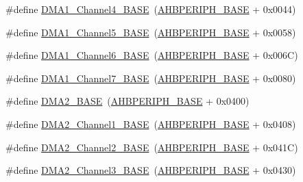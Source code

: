 \begin{DoxyCompactItemize}
\item 
\#define \hyperlink{group___peripheral__memory__map_ga1adc93cd0baf0897202c71110e045692}{D\+M\+A1\+\_\+\+Channel4\+\_\+\+B\+A\+SE}~(\hyperlink{openmotestm_2library_2inc_2stm32f10x__map_8h_a92eb5d49730765d2abd0f5b09548f9f5}{A\+H\+B\+P\+E\+R\+I\+P\+H\+\_\+\+B\+A\+SE} + 0x0044)
\item 
\#define \hyperlink{group___peripheral__memory__map_gac041a71cd6c1973964f847a68aa14478}{D\+M\+A1\+\_\+\+Channel5\+\_\+\+B\+A\+SE}~(\hyperlink{openmotestm_2library_2inc_2stm32f10x__map_8h_a92eb5d49730765d2abd0f5b09548f9f5}{A\+H\+B\+P\+E\+R\+I\+P\+H\+\_\+\+B\+A\+SE} + 0x0058)
\item 
\#define \hyperlink{group___peripheral__memory__map_ga896c2c7585dd8bc3969cf8561f689d2d}{D\+M\+A1\+\_\+\+Channel6\+\_\+\+B\+A\+SE}~(\hyperlink{openmotestm_2library_2inc_2stm32f10x__map_8h_a92eb5d49730765d2abd0f5b09548f9f5}{A\+H\+B\+P\+E\+R\+I\+P\+H\+\_\+\+B\+A\+SE} + 0x006\+C)
\item 
\#define \hyperlink{group___peripheral__memory__map_gaeee0d1f77d0db1db533016a09351166c}{D\+M\+A1\+\_\+\+Channel7\+\_\+\+B\+A\+SE}~(\hyperlink{openmotestm_2library_2inc_2stm32f10x__map_8h_a92eb5d49730765d2abd0f5b09548f9f5}{A\+H\+B\+P\+E\+R\+I\+P\+H\+\_\+\+B\+A\+SE} + 0x0080)
\item 
\#define \hyperlink{group___peripheral__memory__map_gab72a9ae145053ee13d1d491fb5c1df64}{D\+M\+A2\+\_\+\+B\+A\+SE}~(\hyperlink{openmotestm_2library_2inc_2stm32f10x__map_8h_a92eb5d49730765d2abd0f5b09548f9f5}{A\+H\+B\+P\+E\+R\+I\+P\+H\+\_\+\+B\+A\+SE} + 0x0400)
\item 
\#define \hyperlink{group___peripheral__memory__map_gad3bd6c4201d12f5d474518c1b02f8e3b}{D\+M\+A2\+\_\+\+Channel1\+\_\+\+B\+A\+SE}~(\hyperlink{openmotestm_2library_2inc_2stm32f10x__map_8h_a92eb5d49730765d2abd0f5b09548f9f5}{A\+H\+B\+P\+E\+R\+I\+P\+H\+\_\+\+B\+A\+SE} + 0x0408)
\item 
\#define \hyperlink{group___peripheral__memory__map_ga22f39f23c879c699b88e04a629f69d1c}{D\+M\+A2\+\_\+\+Channel2\+\_\+\+B\+A\+SE}~(\hyperlink{openmotestm_2library_2inc_2stm32f10x__map_8h_a92eb5d49730765d2abd0f5b09548f9f5}{A\+H\+B\+P\+E\+R\+I\+P\+H\+\_\+\+B\+A\+SE} + 0x041\+C)
\item 
\#define \hyperlink{group___peripheral__memory__map_ga6f2369b8bc155fb55a28891987605c2c}{D\+M\+A2\+\_\+\+Channel3\+\_\+\+B\+A\+SE}~(\hyperlink{openmotestm_2library_2inc_2stm32f10x__map_8h_a92eb5d49730765d2abd0f5b09548f9f5}{A\+H\+B\+P\+E\+R\+I\+P\+H\+\_\+\+B\+A\+SE} + 0x0430)
\item 

\end{DoxyCompactItemize}
